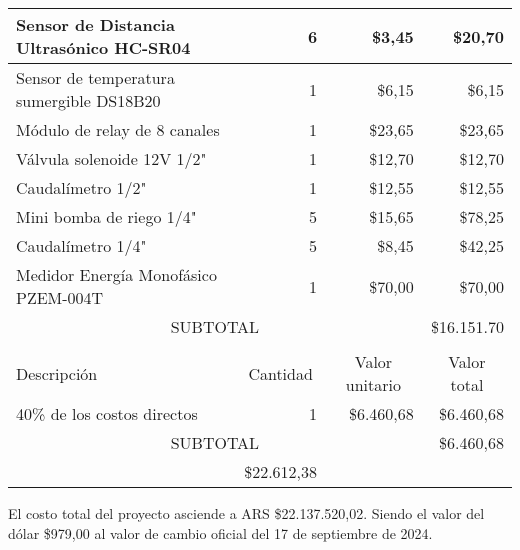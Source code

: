 \begin{table}[htpb]
\begin{tabularx}{\linewidth}{@{}|X|c|r|r|@{}}
		Sensor de Distancia Ultrasónico HC-SR04  & 
		\multicolumn{1}{r|}{6} & \multicolumn{1}{r|}{\$3,45} & \multicolumn{1}{r|}{\$20,70} \\ \hline
		Sensor de temperatura sumergible DS18B20  & 
		\multicolumn{1}{r|}{1} & \multicolumn{1}{r|}{\$6,15} & \multicolumn{1}{r|}{\$6,15} \\ \hline
		Módulo de relay de 8 canales  & 
		\multicolumn{1}{r|}{1} & \multicolumn{1}{r|}{\$23,65} & \multicolumn{1}{r|}{\$23,65} \\ \hline
		Válvula solenoide 12V 1/2"  & 
		\multicolumn{1}{r|}{1} & \multicolumn{1}{r|}{\$12,70} & \multicolumn{1}{r|}{\$12,70} \\ \hline
		Caudalímetro 1/2"  & 
		\multicolumn{1}{r|}{1} & \multicolumn{1}{r|}{\$12,55} & \multicolumn{1}{r|}{\$12,55} \\ \hline
		Mini bomba de riego 1/4"  & 
		\multicolumn{1}{r|}{5} & \multicolumn{1}{r|}{\$15,65} & \multicolumn{1}{r|}{\$78,25} \\ \hline
		Caudalímetro 1/4"  & 
		\multicolumn{1}{r|}{5} & \multicolumn{1}{r|}{\$8,45} & \multicolumn{1}{r|}{\$42,25} \\ \hline
		Medidor Energía Monofásico PZEM-004T  & 
		\multicolumn{1}{r|}{1} & \multicolumn{1}{r|}{\$70,00} & \multicolumn{1}{r|}{\$70,00} \\ \hline
		
		\multicolumn{3}{|c|}{SUBTOTAL} & \multicolumn{1}{r|}{\$16.151.70} \\ \hline
		\rowcolor[HTML]{C0C0C0}
		\multicolumn{4}{|c|}{\cellcolor[HTML]{C0C0C0}COSTOS INDIRECTOS} \\ \hline
		\rowcolor[HTML]{C0C0C0}
		Descripción                                                 &
		\multicolumn{1}{c|}{\cellcolor[HTML]{C0C0C0}Cantidad}       &
		\multicolumn{1}{c|}{\cellcolor[HTML]{C0C0C0}Valor unitario} &
		\multicolumn{1}{c|}{\cellcolor[HTML]{C0C0C0}Valor total}        \\ \hline
		40\% de los costos directos   & 
		\multicolumn{1}{r|}{1} & \multicolumn{1}{r|}{\$6.460,68} & \multicolumn{1}{r|}{\$6.460,68} \\ \hline
		
		\multicolumn{3}{|c|}{SUBTOTAL}                              &
		\multicolumn{1}{r|}{\$6.460,68}                                           \\ \hline
		\rowcolor[HTML]{C0C0C0}
		\multicolumn{3}{|c|}{TOTAL}                                 & \$22.612,38
		\\ \hline
	\end{tabularx}%
\end{table}

\vspace{5mm}
El costo total del proyecto asciende a ARS \$22.137.520,02. Siendo el valor del dólar \$979,00 al valor de cambio oficial del 17 de septiembre de 2024.